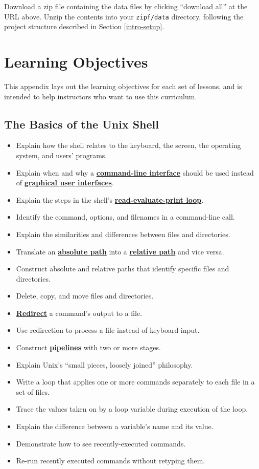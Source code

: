\documentclass[
]{krantz}
\providecommand{\tightlist}{%
  \setlength{\itemsep}{0pt}\setlength{\parskip}{0pt}}
\newcommand{\gref}[2]{\hyperlink{#2}{\textbf{#1}}}
\begin{document}
Download a zip file containing the data files by clicking ``download all'' at the URL above.
Unzip the contents into your \texttt{zipf/data} directory,
following the project structure described in Section \ref{intro-setup}.

\hypertarget{objectives}{%
\chapter{Learning Objectives}\label{objectives}}

This appendix lays out the learning objectives for each set of lessons,
and is intended to help instructors who want to use this curriculum.

\hypertarget{the-basics-of-the-unix-shell}{%
\section{The Basics of the Unix Shell}\label{the-basics-of-the-unix-shell}}

\begin{itemize}
\tightlist
\item
  Explain how the shell relates to the keyboard, the screen, the operating system, and users' programs.
\item
  Explain when and why a \gref{command-line interface}{cli} should be used instead of \gref{graphical user interfaces}{gui}.
\item
  Explain the steps in the shell's \gref{read-evaluate-print loop}{repl}.
\item
  Identify the command, options, and filenames in a command-line call.
\item
  Explain the similarities and differences between files and directories.
\item
  Translate an \gref{absolute path}{absolute\_path} into a \gref{relative path}{relative\_path} and vice versa.
\item
  Construct absolute and relative paths that identify specific files and directories.
\item
  Delete, copy, and move files and directories.
\item
  \gref{Redirect}{redirection} a command's output to a file.
\item
  Use redirection to process a file instead of keyboard input.
\item
  Construct \gref{pipelines}{pipe\_shell} with two or more stages.
\item
  Explain Unix's ``small pieces, loosely joined'' philosophy.
\item
  Write a loop that applies one or more commands separately to each file in a set of files.
\item
  Trace the values taken on by a loop variable during execution of the loop.
\item
  Explain the difference between a variable's name and its value.
\item
  Demonstrate how to see recently-executed commands.
\item
  Re-run recently executed commands without retyping them.
\end{itemize}
\end{document}
